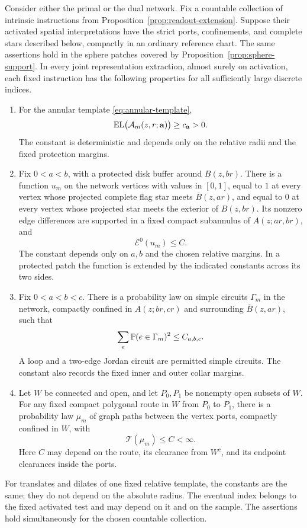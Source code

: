 \begin{theorem}\label{thm:network-bounds}
Consider either the primal or the dual network.  Fix a countable collection
of intrinsic instructions from Proposition~\ref{prop:readout-extension}.
Suppose their activated spatial interpretations have the strict ports,
confinements, and complete stars described below, compactly in an ordinary
reference chart.  The same assertions hold in the sphere patches covered
by Proposition~\ref{prop:sphere-support}.  In every joint representation
extraction, almost surely on activation, each fixed instruction has the
following properties for all sufficiently large discrete indices.
\begin{enumerate}[label=\textup{(\roman*)}]
\item For the annular template \eqref{eq:annular-template},
\[
 \operatorname{EL}\bigl(\mathcal A_m(z,r;\mathbf a)\bigr)\ge c_{\mathbf a}>0.
\]
The constant is deterministic and depends only on the relative radii and
the fixed protection margins.
\item Fix \(0<a<b\), with a protected disk buffer around \(B(z,br)\).
There is a function \(u_m\) on the network vertices with values in
\([0,1]\), equal to \(1\) at every vertex whose projected complete flag
star meets \(\overline B(z,ar)\), and equal to \(0\) at every vertex whose
projected star meets
the exterior of \(B(z,br)\).  Its nonzero edge differences are supported
in a fixed compact subannulus of \(A(z;ar,br)\), and
\[
 \mathcal E^0(u_m)\le C.
\]
The constant depends only on \(a,b\) and the chosen relative margins.
In a protected patch the function is extended by the indicated constants
across its two sides.
\item Fix \(0<a<b<c\).  There is a probability law on simple circuits
\(\Gamma_m\) in the network, compactly confined in \(A(z;br,cr)\) and
surrounding \(\overline B(z,ar)\), such that
\[
 \sum_e\mathbb P(e\in\Gamma_m)^2\le C_{a,b,c}.
\]
A loop and a two-edge Jordan circuit are permitted simple circuits.
The constant also records the fixed inner and outer collar margins.
\item Let \(W\) be connected and open, and let \(P_0,P_1\) be nonempty
open subsets of \(W\).  For any fixed compact polygonal route in \(W\)
from \(P_0\) to \(P_1\), there is a probability law \(\mu_m\) of graph
paths between the vertex ports, compactly confined in \(W\), with
\[
 \mathcal T(\mu_m)\le C<\infty .
\]
Here \(C\) may depend on the route, its clearance from \(W^c\), and its
endpoint clearances inside the ports.
\end{enumerate}
For translates and dilates of one fixed relative template, the constants
are the same; they do not depend on the absolute radius.  The eventual
index belongs to the fixed activated test and may depend on it and on the
sample.  The assertions hold simultaneously for the chosen countable
collection.
\end{theorem}

